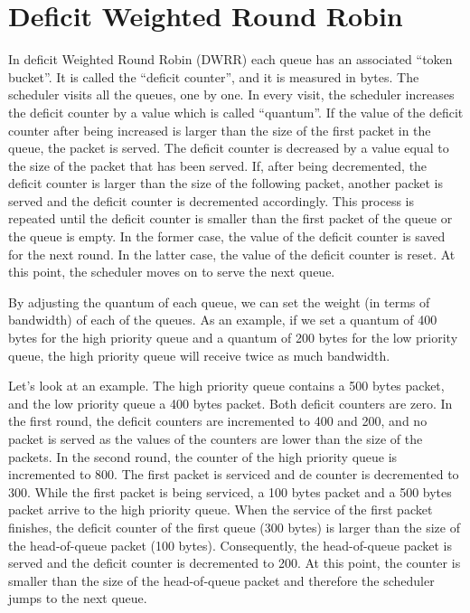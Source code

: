 \section{Deficit Weighted Round Robin}

In deficit Weighted Round Robin (DWRR) each queue has an associated ``token bucket''.
It is called the ``deficit counter'', and it is measured in bytes.
The scheduler visits all the queues, one by one.
In every visit, the scheduler increases the deficit counter by a value which is called ``quantum''.
If the value of the deficit counter after being increased is larger than the size of the first packet in the queue, the packet is served.
The deficit counter is decreased by a value equal to the size of the packet that has been served.
If, after being decremented, the deficit counter is larger than the size of the following packet, another packet is served and the deficit counter is decremented accordingly.
This process is repeated until the deficit counter is smaller than the first packet of the queue or the queue is empty.
In the former case, the value of the deficit counter is saved for the next round.
In the latter case, the value of the deficit counter is reset.
At this point, the scheduler moves on to serve the next queue.

By adjusting the quantum of each queue, we can set the weight (in terms of bandwidth) of each of the queues.
As an example, if we set a quantum of 400 bytes for the high priority queue and a quantum of 200 bytes for the low priority queue, the high priority queue will receive twice as much bandwidth.

Let's look at an example.
The high priority queue contains a 500 bytes packet, and the low priority queue a 400 bytes packet.
Both deficit counters are zero.
In the first round, the deficit counters are incremented to 400 and 200, and no packet is served as the values of the counters are lower than the size of the packets.
In the second round, the counter of the high priority queue is incremented to 800.
The first packet is serviced and de counter is decremented to 300.
While the first packet is being serviced, a 100 bytes packet and a 500 bytes packet arrive to the high priority queue.
When the service of the first packet finishes, the deficit counter of the first queue (300 bytes) is larger than the size of the head-of-queue packet (100 bytes).
Consequently, the head-of-queue packet is served and the deficit counter is decremented to 200.
At this point, the counter is smaller than the size of the head-of-queue packet and therefore the scheduler jumps to the next queue.

